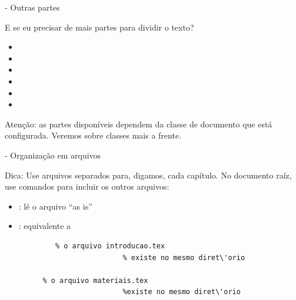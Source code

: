 \documentclass[xcolor=table]{beamer}
\begin{document}
\begin{frame}[fragile]{\insertsubsection{} - Outras partes}

E se eu precisar de mais partes para dividir o texto?

  \begin{itemize}
    \item {}
    \item {}
    \item {}
    \item {}
    \item {}
    \item {}
  \end{itemize}
  
  \alert{Atenção:} as partes disponíveis dependem da classe de documento que está configurada. Veremos sobre classes mais a frente.
\end{frame}

\begin{frame}[fragile]{\insertsubsection{} - Organização em arquivos}

\alert{Dica:} Use arquivos separados para, digamos, cada capítulo. No documento raíz, use comandos para incluir os outros arquivos:

\begin{itemize}
	\item {}: lê o arquivo ``as is''
	\item {}:	equivalente a   
\end{itemize}
	
	\begin{verbatim}
		 	% o arquivo introducao.tex
							% existe no mesmo diret\'orio
							
		 % o arquivo materiais.tex 
							%existe no mesmo diret\'orio
	\end{verbatim}
	  
  
\end{frame}

\end{document}
